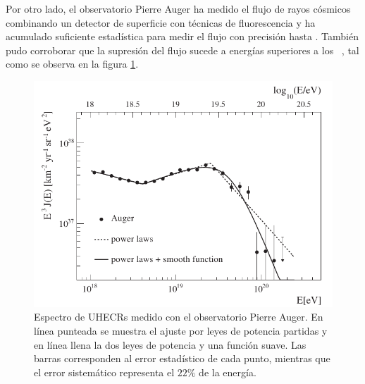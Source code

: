 Por otro lado, el observatorio Pierre Auger ha medido el flujo de rayos c\'osmicos combinando un detector de superficie con t\'ecnicas de fluorescencia y ha acumulado suficiente estad\'istica para medir el flujo con precisi\'on hasta . 
Tambi\'en pudo corroborar que la supresi\'on del flujo sucede a energ\'ias superiores a los ~\cite{cite:AugerSpectrum}, tal como se observa en la figura \ref{fig:specGZK}.
%
\begin{figure}[ht]
	\begin{center}
	\includegraphics[width=\textwidth]{fig/introduccion/spectrum_withGZK}
	\caption{\label{fig:specGZK} Espectro de UHECRs medido con el observatorio Pierre Auger. En l\'inea punteada se muestra el ajuste por leyes de potencia partidas y en l\'inea llena la dos leyes de potencia y una funci\'on suave. Las barras corresponden al error estad\'istico de cada punto, mientras que el error sistem\'atico representa el $22\%$ de la energ\'ia.}
	\end{center}
\end{figure}

